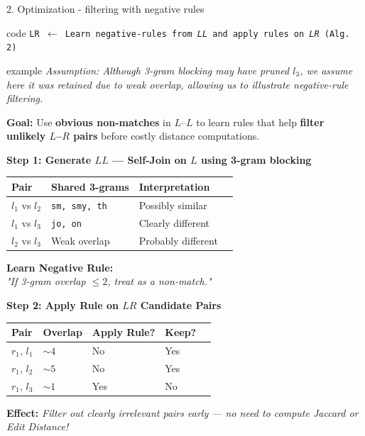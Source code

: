 \documentclass[8pt]{beamer} %
\begin{document}
\begin{frame}{2. Optimization - filtering with negative rules}
	

	\begin{beamercolorbox}[rounded=true, shadow=true, leftskip=1em, rightskip=1em]{code}
		\texttt{LR $\leftarrow$ Learn negative-rules from \textit{LL} and apply rules on \textit{LR} (Alg. 2)}
	\end{beamercolorbox}

	\vspace{0.5em}

	\begin{beamercolorbox}[rounded=true, shadow=true, leftskip=1em, rightskip=1em]{example}
		\textit{\small Assumption: Although 3-gram blocking may have pruned $l_3$, we assume here it was retained due to weak overlap, allowing us to illustrate negative-rule filtering.}
		
		\vspace{1em}
		\textbf{Goal:} Use \textbf{obvious non-matches} in $L$–$L$ to learn rules that help \textbf{filter unlikely $L$–$R$ pairs} before costly distance computations.
		
		\vspace{0.5em}
		\textbf{Step 1: Generate $LL$ — Self-Join on $L$ using 3-gram blocking}
		
		\begin{tabular}{llll}
			\textbf{Pair} & \textbf{Shared 3-grams} & \textbf{Interpretation} \\
			\hline
			$l_1$ vs $l_2$ & \texttt{sm, smy, th}  & Possibly similar \\
			$l_1$ vs $l_3$ & \texttt{jo, on}       & Clearly different \\
			$l_2$ vs $l_3$ & Weak overlap          & Probably different \\
		\end{tabular}
		
		\vspace{0.5em}
		\textbf{Learn Negative Rule:} \\
		\textit{"If 3-gram overlap $\leq 2$, treat as a non-match."}
		
		\vspace{0.5em}
		\textbf{Step 2: Apply Rule on $LR$ Candidate Pairs}
		\begin{tabular}{lllll}
			\textbf{Pair} & \textbf{Overlap} & \textbf{Apply Rule?} & \textbf{Keep?} \\
			\hline
			$r_1$, $l_1$  & $\sim 4$  & No  & Yes \\
			$r_1$, $l_2$  & $\sim 5$  & No  & Yes \\
			$r_1$, $l_3$  & $\sim 1$  & Yes & No  \\
		\end{tabular}
		
		\vspace{0.5em}
		\textbf{Effect:} \textit{Filter out clearly irrelevant pairs early — no need to compute Jaccard or Edit Distance!}
	\end{beamercolorbox}
\end{frame}
\end{document}

